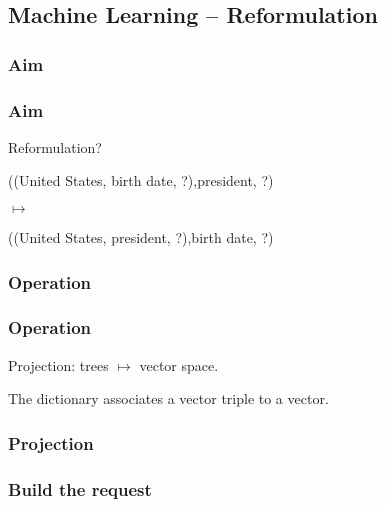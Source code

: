 \subsection{Machine Learning \--- Reformulation}

\subsubsection{Aim}

\begin{frame}
\frametitle{Aim}
\alert{Reformulation?}

\pause


((United States, birth date, ?),president, ?)

$\mapsto$

((United States, president, ?),birth date, ?)

\end{frame}

\subsubsection{Operation}
\begin{frame}
\frametitle{Operation}
\alert{Projection:} trees $\mapsto$ vector space.

The dictionary associates a vector triple to a vector.
\end{frame}

\begin{frame}
\frametitle{Projection}
\begin{center}
\end{center}
\end{frame}

\subsubsection{Build the request}

